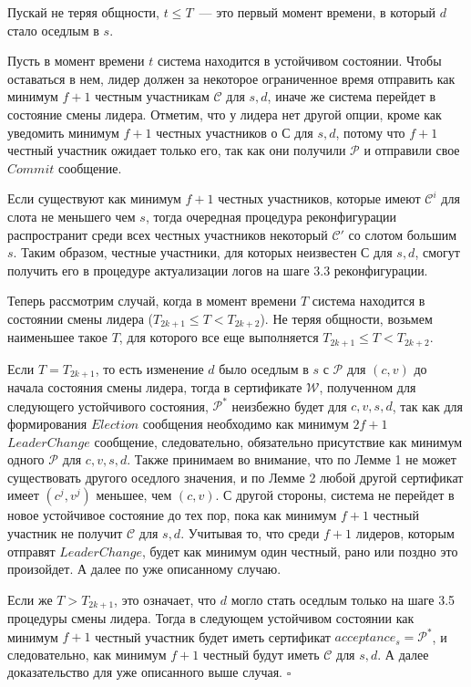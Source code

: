 Пускай не теряя общности, $t \le T$~--- это первый момент времени, в который $d$ стало оседлым в $s$.

Пусть в момент времени $t$ система находится в устойчивом состоянии. Чтобы оставаться в нем, лидер  должен за некоторое ограниченное время отправить как минимум $f+1$ честным участникам $\mathcal{C}$ для $s, d$, иначе же система перейдет в состояние смены лидера. Отметим, что у лидера нет другой опции, кроме как уведомить минимум $f+1$ честных участников о $\mathcal{С}$ для $s, d$, потому что $f+1$ честный участник ожидает только его, так как они получили $\mathcal{P}$ и отправили свое $Commit$ сообщение.

Если существуют как минимум $f+1$ честных участников, которые имеют $\mathcal{C}^i$ для слота не меньшего чем $s$, тогда очередная процедура реконфигурации распространит среди всех честных участников некоторый $\mathcal{C}'$ со слотом большим $s$. Таким образом, честные участники, для которых неизвестен $\mathcal{С}$ для $s, d$, смогут получить его в процедуре актуализации логов на шаге 3.3 реконфигурации.

Теперь рассмотрим случай, когда в момент времени $T$ система находится в состоянии смены лидера ($T_{2k+1} \le T < T_{2k+2}$). Не теряя общности, возьмем наименьшее такое $T$, для которого все еще выполняется $T_{2k+1} \le T < T_{2k+2}$.

Если $T= T_{2k+1}$, то есть изменение $d$ было оседлым в $s$ с $\mathcal{P}$ для $(c, v)$ до начала состояния смены лидера, тогда в сертификате $\mathcal{W}$, полученном для следующего устойчивого состояния, $\mathcal{P}^{*}$ неизбежно будет для $c, v, s, d$, так как для формирования $Election$ сообщения необходимо как минимум $2f+1$ $LeaderChange$ сообщение, следовательно, обязательно присутствие как минимум одного $\mathcal{P}$ для $c, v, s, d$. Также принимаем во внимание, что по Лемме 1 не может существовать другого оседлого значения, и по Лемме 2 любой другой сертификат имеет $(c^j, v^j)$ меньшее, чем $(c, v)$. С другой стороны, система не перейдет в новое устойчивое состояние до тех пор, пока как минимум $f+1$ честный участник не получит $\mathcal{C}$ для $s, d$. Учитывая то, что среди $f+1$ лидеров, которым отправят $LeaderChange$, будет как минимум один честный, рано или поздно это произойдет. А далее по уже описанному случаю.

Если же  $T > T_{2k+1}$, это означает, что $d$ могло стать оседлым только на шаге 3.5 процедуры смены лидера. Тогда в следующем устойчивом состоянии как минимум $f+1$ честный участник будет иметь сертификат $acceptance_s = \mathcal{P}^{*}$, и следовательно, как минимум $f+1$ честный будут иметь $\mathcal{C}$ для $s, d$. А далее доказательство для уже описанного выше случая.
$\square$
\vspace{10pt}

